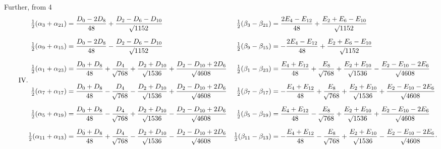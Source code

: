 \clearpage
\begin{landscape}
\begingroup
\fontsize{9.5}{12}\selectfont
{}
\renewcommand{\headrulewidth}{0pt}
\makeatletter\tagsleft@true\let\veqno\@@leqno\makeatother
\setlength{\lineskip}{4pt}\setlength{\lineskiplimit}{4pt}
\newcommand{\VthreeRaisedPoint}{\mathord{\text{\raisebox{.5ex}{.}}}}
\newcommand{\VthreeDZeroMark}{\mathord{\text{\makebox[0pt][l]{\kern-.2em\raisebox{1.25ex}{\rotatebox{10}{\rule{.04em}{.24ex}}}}}}}
\par\noindent\hspace*{\parindent}Further, from 4
\[
\tag*{IV.}
\begin{aligned}
\tfrac12(\alpha_3+\alpha_{21})&=\frac{D_0-2D_8}{48}+\frac{D_2-D_6-D_{10}}{\BareRoot{1152}}&\;\tfrac12(\beta_3-\beta_{21})&=\frac{2E_4-E_{12}}{48}+\frac{E_2+E_6-E_{10}}{\BareRoot{1152}}\\[6pt]
\tfrac12(\alpha_9+\alpha_{15})&=\frac{D_0-2D_8}{48}-\frac{D_2-D_6-D_{10}}{\BareRoot{1152}}&\tfrac12(\beta_9-\beta_{15})&=-\frac{2E_4-E_{12}}{48}+\frac{E_2+E_6-E_{10}}{\BareRoot{1152}}\\[6pt]
\tfrac12(\alpha_1+\alpha_{23})&=\frac{D_0+D_8}{48}+\frac{D_4}{\BareRoot{768}}+\frac{D_2+D_{10}}{\BareRoot{1536}}+\frac{D_2-D_{10}+2D_6}{\BareRoot{4608}}&\tfrac12(\beta_1-\beta_{23})&=\frac{E_4+E_{12}}{48}+\frac{E_8}{\BareRoot{768}}+\frac{E_2+E_{10}}{\BareRoot{1536}}-\frac{E_2-E_{10}-2E_6}{\BareRoot{4608}}\\[6pt]
\tfrac12(\alpha_7+\alpha_{17})&=\frac{D_0+D_8}{48}-\frac{D_4}{\BareRoot{768}}-\frac{D_2+D_{10}}{\BareRoot{1536}}+\frac{D_2-D_{10}+2D_6}{\BareRoot{4608}}&\tfrac12(\beta_7-\beta_{17})&=-\frac{E_4+E_{12}}{48}+\frac{E_8}{\BareRoot{768}}+\frac{E_2+E_{10}}{\BareRoot{1536}}+\frac{E_2-E_{10}-2E_6}{\BareRoot{4608}}\\[6pt]
\tfrac12(\alpha_5+\alpha_{19})&=\frac{D_0+D_8}{48}-\frac{D_4}{\BareRoot{768}}+\frac{D_2+D_{10}}{\BareRoot{1536}}-\frac{D_2-D_{10}+2D_6}{\BareRoot{4608}}&\tfrac12(\beta_5-\beta_{19})&=\frac{E_4+E_{12}}{48}-\frac{E_8}{\BareRoot{768}}+\frac{E_2+E_{10}}{\BareRoot{1536}}+\frac{E_2-E_{10}-2E_6}{\BareRoot{4608}}\\[6pt]
\tfrac12(\alpha_{11}+\alpha_{13})&=\frac{D_0\VthreeDZeroMark+D_8}{48}+\frac{D_4}{\BareRoot{768}}-\frac{D_2+D_{10}}{\BareRoot{1536}}-\frac{D_2-D_{10}+2D_6}{\BareRoot{4608}}&\tfrac12(\beta_{11}-\beta_{13})&=-\frac{E_4+E_{12}}{48}-\frac{E_8}{\BareRoot{768}}+\frac{E_2+E_{10}}{\BareRoot{1536}}-\frac{E_2-E_{10}-2E_6}{\BareRoot{4608}}\VthreeRaisedPoint
\end{aligned}
\]
\clearpage
\endgroup
\end{landscape}
